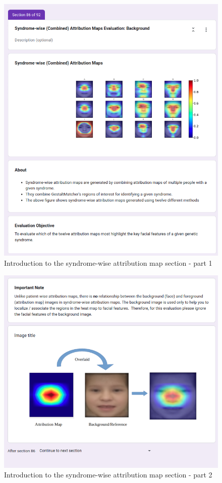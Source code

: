\documentclass[../report.tex]{subfiles}
\begin{document}
		\begin{figure}[H]
			\centering
			\includegraphics[scale=0.55]{images/quest/6.png}
			\caption{Introduction to the syndrome-wise attribution map section - part 1}
		\end{figure}
		\begin{figure}
			\continuedfloat
			\centering
			\includegraphics[scale=0.55]{images/quest/7.png}
			\caption{Introduction to the syndrome-wise attribution map section - part 2}
						\label{fig_z}
			\addtocounter{figure}{1}
		\end{figure}
\end{document}
